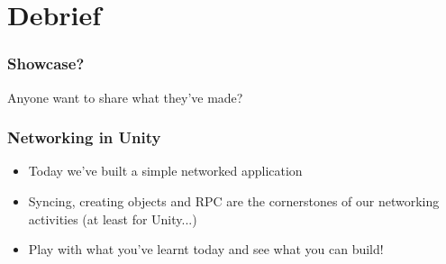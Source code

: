 \documentclass{beamer}
\begin{document}
	\section{Debrief}
	
	\begin{frame}
		\frametitle{Showcase?}
		
		\begin{center}
			Anyone want to share what they've made?
		\end{center}
	\end{frame}
	
	\begin{frame}
		\frametitle{Networking in Unity}
		
		\begin{itemize}
			\item Today we've built a simple networked application
			\item Syncing, creating objects and RPC are the cornerstones of our networking activities (at least for Unity...)
			\item Play with what you've learnt today and see what you can build!
		\end{itemize}
	
	\end{frame}
\end{document}
